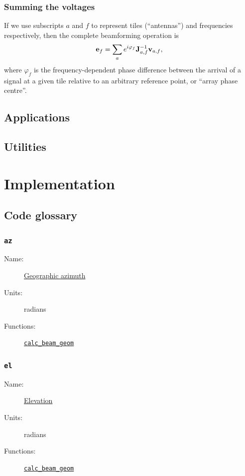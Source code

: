 \documentclass{book}
\begin{document}
\subsection{Summing the voltages}

If we use subscripts $a$ and $f$ to represent tiles (``antennas'') and frequencies respectively, then the complete beamforming operation is
\begin{equation}
    {\bf e}_f = \sum_a e^{i\varphi_f} {\bf J}_{a,f}^{-1} {\bf v}_{a,f},
\end{equation}
where $\varphi_f$ is the frequency-dependent phase difference between the arrival of a signal at a given tile relative to an arbitrary reference point, or ``array phase centre''.

\section{Applications}

\section{Utilities}

\chapter{Implementation}

\section{Code glossary}

\subsection{\texttt{az}}
\begin{description}
    \item[Name:] \hyperlink{sec:coordslocalsky}{Geographic azimuth}
    \item[Units:] radians
    \item[Functions:] \hyperlink{fcn:calc_beam_geom}{\texttt{calc\_beam\_geom}}
\end{description}

\subsection{\texttt{el}}
\begin{description}
    \item[Name:] \hyperlink{sec:coordslocalsky}{Elevation}
    \item[Units:] radians
    \item[Functions:] \hyperlink{fcn:calc_beam_geom}{\texttt{calc\_beam\_geom}}
\end{description}
\end{document}
